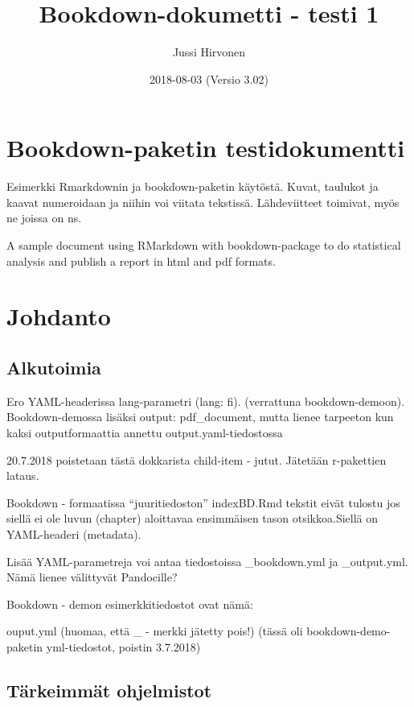 \documentclass[finnish,]{book}
\title{Bookdown-dokumetti - testi 1}
\author{Jussi Hirvonen}
\date{2018-08-03 (Versio 3.02)}
\theoremstyle{definition}
\theoremstyle{definition}
\theoremstyle{definition}
\theoremstyle{remark}
\begin{document}
\maketitle

{
\setcounter{tocdepth}{1}
\tableofcontents
}
\hypertarget{bookdown-paketin-testidokumentti}{%
\chapter{Bookdown-paketin
testidokumentti}\label{bookdown-paketin-testidokumentti}}

Esimerkki Rmarkdownin ja bookdown-paketin käytöstä. Kuvat, taulukot ja
kaavat numeroidaan ja niihin voi viitata tekstissä. Lähdeviitteet
toimivat, myös ne joissa on ns.

A sample document using RMarkdown with bookdown-package to do
statistical analysis and publish a report in html and pdf formats.

\hypertarget{johdanto}{%
\chapter{Johdanto}\label{johdanto}}

\hypertarget{alkutoimia}{%
\section{Alkutoimia}\label{alkutoimia}}

Ero YAML-headerissa lang-parametri (lang: fi). (verrattuna
bookdown-demoon). Bookdown-demossa lisäksi output: pdf\_document, mutta
lienee tarpeeton kun kaksi outputformaattia annettu
output.yaml-tiedostossa

20.7.2018 poistetaan tästä dokkarista child-item - jutut. Jätetään
r-pakettien lataus.

Bookdown - formaatissa ``juuritiedoston'' indexBD.Rmd tekstit eivät
tulostu jos siellä ei ole luvun (chapter) aloittavaa ensimmäisen tason
otsikkoa.Siellä on YAML-headeri (metadata).

Lisää YAML-parametreja voi antaa tiedostoissa \_bookdown.yml ja
\_output.yml. Nämä lienee välittyvät Pandocille?

Bookdown - demon esimerkkitiedostot ovat nämä:

ouput.yml (huomaa, että \_ - merkki jätetty pois!) (tässä oli
bookdown-demo-paketin yml-tiedostot, poistin 3.7.2018)

\hypertarget{tarkeimmat-ohjelmistot}{%
\section{Tärkeimmät ohjelmistot}\label{tarkeimmat-ohjelmistot}}
\end{document}
